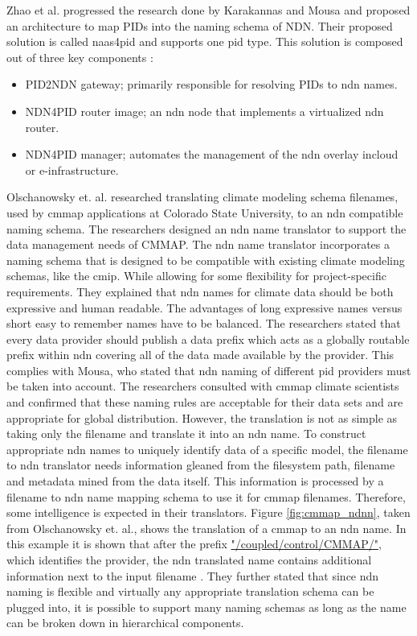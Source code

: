Zhao et al. progressed the research done by Karakannas \cite{icn-bd} and Mousa \cite{ndn-app-aware} and proposed an architecture to map PIDs into the naming schema of NDN. Their proposed solution is called \gls{naas4pid} and supports one \gls{pid} type. This solution is composed out of three key components \cite{koulouzis2018information}:
\begin{itemize}
  \item PID2NDN gateway; primarily responsible for resolving PIDs to \gls{ndn} names.
  \item NDN4PID router image; an \gls{ndn} node that implements a virtualized \gls{ndn} router.
  \item NDN4PID manager; automates the management of the \gls{ndn} overlay in\newline cloud or e-infrastructure.
\end{itemize}

Olschanowsky et. al. researched translating climate modeling schema filenames, used by \gls{cmmap} applications at Colorado State University, to an \gls{ndn} compatible 
naming schema. The researchers designed an \gls{ndn} name translator to support the data management needs of CMMAP. The \gls{ndn} name translator incorporates a naming schema that is designed to be compatible with existing climate modeling schemas, like the \gls{cmip}. While allowing for some flexibility for project-specific requirements. They explained that \gls{ndn} names for climate data should be both expressive and human readable. The advantages of long expressive names versus short easy to remember names have to be balanced.
The researchers stated that every data provider should publish a data prefix which acts as a globally
routable prefix within \gls{ndn} covering all of the data made available by the provider. This complies with Mousa, who stated that \gls{ndn} naming of different \gls{pid} providers must be taken into account. The researchers consulted with \gls{cmmap} climate scientists and confirmed that these naming rules are acceptable for their data sets and are appropriate for global distribution. 
However, the translation is not as simple as taking only the filename and translate it into an \gls{ndn} name. To construct appropriate \gls{ndn} names to uniquely identify data of a specific model, the filename to \gls{ndn} translator needs information gleaned from the filesystem path, filename and metadata mined from the data itself. This information is processed by a filename to \gls{ndn} name mapping schema to use it for \gls{cmmap} filenames. Therefore, some intelligence is expected in their translators.
Figure \ref{fig:cmmap_ndnn}, taken from Olschanowsky et. al., shows the translation of a \gls{cmmap} to an \gls{ndn} name. In this example it is shown that after the prefix \url{"/coupled/control/CMMAP/"}, which identifies the provider, the \gls{ndn} translated name contains additional information next to the input filename \cite{ndn-clim}.
They further stated that since \gls{ndn} naming is flexible and virtually any appropriate translation schema can be plugged into, it is possible to support many naming schemas as long as the name can be broken down in hierarchical components.

